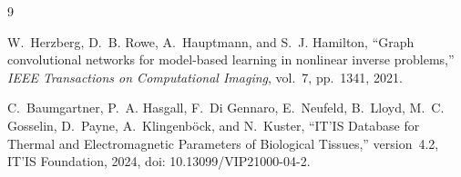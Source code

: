 \documentclass[11pt]{article}
\begin{document}
\endgroup
\clearpage

\endgroup

\endgroup

\begin{thebibliography}{9}

W.~Herzberg, D.~B. Rowe, A.~Hauptmann, and S.~J. Hamilton, ``Graph convolutional networks for model-based learning in nonlinear inverse problems,'' \emph{IEEE Transactions on Computational Imaging}, vol.~7, pp.~1341, 2021.

C.~Baumgartner, P.~A. Hasgall, F.~Di Gennaro, E.~Neufeld, B.~Lloyd, M.~C. Gosselin, D.~Payne, A.~Klingenb\"ock, and N.~Kuster, ``IT'IS Database for Thermal and Electromagnetic Parameters of Biological Tissues,'' version~4.2, IT'IS Foundation, 2024, doi: 10.13099/VIP21000-04-2.

\end{thebibliography}
\end{document}

